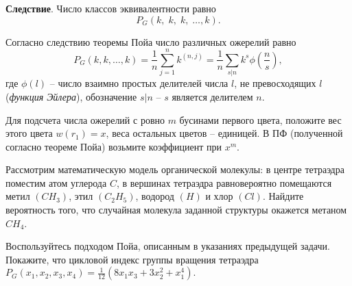 \textbf{Следствие}. 
Число классов эквивалентности равно 
$$P_{G} \left(k,\; k,\; k,\; \ldots ,k\right).$$ 

Согласно следствию теоремы Пойа число различных ожерелий равно $$P_{G} (k,k,\ldots ,k)=\frac{1}{n} \sum _{j=1}^{n}k^{(n,j)}  =\frac{1}{n} \sum _{s|n}k^{s} \phi \left(\frac{n}{s} \right), $$ где $\phi \left(l\right)$ -- число взаимно простых делителей числа $l$, не превосходящих $l$ (\textit{функция Эйлера}), обозначение $s|n$ -- $s$ является делителем $n$.

Для подсчета числа ожерелий с ровно $m$ бусинами первого цвета, положите вес этого цвета $w(r_{1} )=x$, веса остальных цветов -- единицей. В ПФ (полученной согласно теореме Пойа) возьмите коэффициент при $x^{m} $.



\begin{problem}

Рассмотрим математическую модель органической молекулы: в центре тетраэдра поместим атом углерода $C$, в вершинах тетраэдра равновероятно помещаются метил $\left(CH_{3} \right)$, этил $\left(C_{2} H_{5} \right)$, водород $\left(H\right)$ и хлор $\left(Cl\right)$. Найдите вероятность того, что случайная молекула заданной структуры окажется метаном $CH_{4} $. 

\end{problem}


\begin{ordre}
 Воспользуйтесь подходом Пойа, описанным в указаниях предыдущей задачи. Покажите, что цикловой индекс группы вращения тетраэдра $P_{G} (x_{1} ,x_{2} ,x_{3} ,x_{4} )=\frac{1}{12} \left(8x_{1} x_{3} +3x_{2} ^{2} +x_{1} ^{4} \right).$
\end{ordre}

\begin{comment}
\begin{problem}[Marching cubes]
Сколько различных раскрасок вершин кубов в 2 цвета можно получить с учетом вращений и отражений?
\end{problem}

\begin{remark}
Сокращение числа раскрасок используется для сжатого хранения и визуализации изоповерхности на трехмерном скалярном поле при помощи алгоритма marching cubes: вместо хранения массива цветов всех вершин трехмерной сетки достаточно хранить номер раскраски каждого куба сетки (вершина считается окрашенной в положительный цвет, если значение поля в ней не меньше значения поля на изоповерхности; в отрицательный цвет, если значение поля в ней меньше значения поля на изоповерхности).  
\end{remark}

\end{comment}

